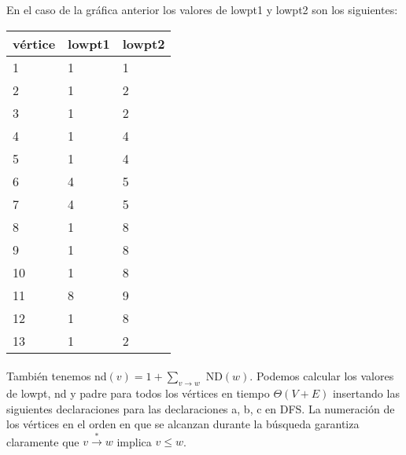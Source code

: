 En el caso de la gráfica anterior los valores de lowpt1 y lowpt2 son los siguientes:\\
\begin{center}
\begin{tabular}{lll}
\toprule
vértice & lowpt1 & lowpt2 \\
\midrule
      1 &      1 &      1 \\
      2 &      1 &      2 \\
      3 &      1 &      2 \\
      4 &      1 &      4 \\
      5 &      1 &      4 \\
      6 &      4 &      5 \\
      7 &      4 &      5 \\
      8 &      1 &      8 \\
      9 &      1 &      8 \\
     10 &      1 &      8 \\
     11 &      8 &      9 \\
     12 &      1 &      8 \\
     13 &      1 &      2 \\
\bottomrule
\end{tabular}
\end{center}

\paragraph{}
También tenemos nd$\left(v\right)= 1 + \sum_{v \rightarrow w} $ ND$\left(w\right)$. Podemos calcular los valores de lowpt, nd y padre para todos los vértices en tiempo $\Theta\left(V + E\right)$ insertando las siguientes declaraciones para las declaraciones a, b, c en DFS. La numeración de los vértices en el orden en que se alcanzan durante la búsqueda garantiza claramente que $v \overset{\ast}{\rightarrow} w$ implica $v \le w$.


